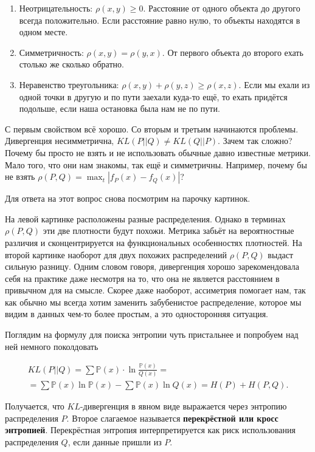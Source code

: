 \documentclass[12pt, a4paper, oneside]{extreport}
\def \mbb{\mathbb}
\def \PP{\mbb{P}}
\newcommand{\indef}[1]{\textbf{#1}}     %
\theoremstyle{plain}              %
\theoremstyle{definition}         %
\begin{document}
\begin{enumerate}
\item   Неотрицательность: $\rho(x,y) \ge 0$. Расстояние от одного объекта до другого всегда положительно. Если расстояние равно нулю, то объекты находятся в одном месте. 

\item  Симметричность: $\rho(x,y) = \rho(y,x)$. От первого объекта до второго ехать столько же сколько обратно. 

\item  Неравенство треугольника: $\rho(x,y) + \rho(y,z) \ge \rho(x,z)$. Если мы ехали из одной точки в другую и по пути заехали куда-то ещё, то ехать придётся подольше, если наша остановка была нам не по пути. 
\end{enumerate}

С первым свойством всё хорошо. Со вторым и третьим начинаются проблемы. Дивергенция несимметрична, $KL(P || Q) \ne KL(Q || P)$. Зачем так сложно? Почему бы просто не взять и не использовать обычные давно известные метрики. Мало того, что они нам знакомы, так ещё и симметричны. Например, почему бы не взять $\rho(P,Q) = \max_t |f_P(x) - f_Q(x) |$? 

Для ответа на этот вопрос снова посмотрим на парочку картинок.



На левой картинке расположены разные распределения. Однако  в терминах $\rho(P,Q)$ эти две плотности будут похожи.  Метрика забьёт на вероятностные различия и сконцентрируется на функциональных особенностях плотностей. На второй картинке наоборот для двух похожих распределений $\rho(P,Q)$ выдаст сильную разницу. Одним словом говоря, дивергенция хорошо зарекомендовала себя на практике даже несмотря на то, что она не является расстоянием в привычном для на смысле. Скорее даже наоборот, ассиметрия помогает нам, так как обычно мы всегда хотим заменить забубенистое распределение, которое мы видим в данных чем-то более простым, а это односторонняя ситуация. 

Поглядим на формулу для поиска энтропии чуть пристальнее и попробуем над ней немного поколдовать

\begin{multline*}
KL(P || Q) = \sum \PP(x) \cdot \ln \frac{ \PP(x)}{Q(x)} = \\ = \sum \PP(x) \ln \PP(x) - \sum \PP(x) \ln Q(x) = H(P) + H(P,Q).
\end{multline*}

Получается, что $KL$-дивергенция в явном виде выражается через энтропию распределения $P$.  Второе слагаемое называется \indef{перекрёстной или кросс энтропией}.  Перекрёстная энтропия интерпретируется как риск использования распределения $Q$, если данные пришли из $P$. 
\end{document}
